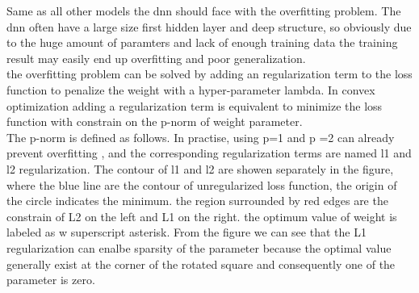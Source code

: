 \begin{frame}
 Same as all other models the dnn should face with the overfitting problem. The dnn often have a large size first hidden layer and deep structure, so obviously due to the huge amount of paramters and lack of enough training data the training result may easily end up overfitting and poor generalization. \\
 
 the overfitting problem can be solved by adding an regularization term to the loss function to penalize the weight with a hyper-parameter lambda. In convex optimization adding a regularization term is equivalent to minimize the loss function with constrain on the p-norm of weight parameter. \\
 
 The p-norm is defined as follows.  In practise, using p=1 and p =2 can already prevent overfitting , and the corresponding regularization terms are named l1 and l2 regularization. The contour of l1 and l2 are showen separately in the figure, where the blue line are the contour of unregularized loss function, the origin of the circle indicates the minimum. the region surrounded by red edges are the constrain of L2 on the left and L1 on the right. the optimum value of weight is labeled as w superscript asterisk. From the figure we can see that the L1 regularization can enalbe sparsity of the parameter because the optimal value generally exist at the corner of the rotated square and consequently one of the parameter is zero. 
\end{frame}


